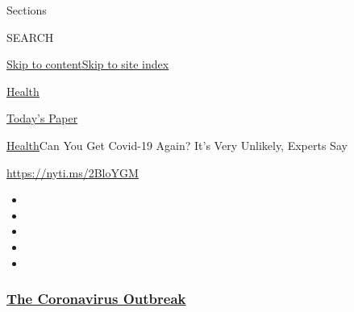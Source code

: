 Sections

SEARCH

\protect\hyperlink{site-content}{Skip to
content}\protect\hyperlink{site-index}{Skip to site index}

\href{https://www.nytimes3xbfgragh.onion/section/health}{Health}

\href{https://myaccount.nytimes3xbfgragh.onion/auth/login?response_type=cookie\&client_id=vi}{}

\href{https://www.nytimes3xbfgragh.onion/section/todayspaper}{Today's
Paper}

\href{/section/health}{Health}\textbar{}Can You Get Covid-19 Again? It's
Very Unlikely, Experts Say

\url{https://nyti.ms/2BloYGM}

\begin{itemize}
\item
\item
\item
\item
\item
\end{itemize}

\hypertarget{the-coronavirus-outbreak}{%
\subsubsection{\texorpdfstring{\href{https://www.nytimes3xbfgragh.onion/news-event/coronavirus?name=styln-coronavirus-national\&region=TOP_BANNER\&block=storyline_menu_recirc\&action=click\&pgtype=Article\&impression_id=3dd1b310-efba-11ea-915b-f1361aecfd51\&variant=undefined}{The
Coronavirus
Outbreak}}{The Coronavirus Outbreak}}\label{the-coronavirus-outbreak}}

